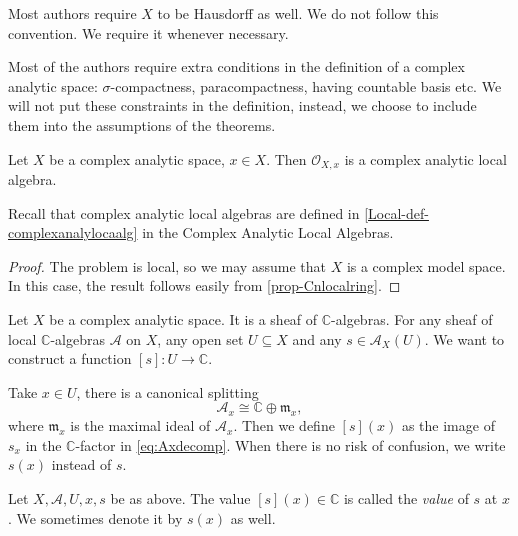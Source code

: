 \begin{remark}
    Most authors require $X$ to be Hausdorff as well. We do not follow this convention. We require it whenever necessary.
\end{remark}
\begin{remark}
    Most of the authors require extra conditions in the definition of a complex analytic space: $\sigma$-compactness, paracompactness, having countable basis etc. We will not put these constraints in the definition, instead, we choose to include them into the assumptions of the theorems.
\end{remark}

\begin{proposition}
    Let $X$ be a complex analytic space, $x\in X$. Then $\mathcal{O}_{X,x}$ is a complex analytic local algebra.
\end{proposition}
Recall that complex analytic local algebras are defined in \cref{Local-def-complexanalylocaalg} in the Complex Analytic Local Algebras.

\begin{proof}
    The problem is local, so we may assume that $X$ is a complex model space. In this case, the result follows easily from \cref{prop-Cnlocalring}.
\end{proof}

Let $X$ be a complex analytic space. It is a sheaf of $\mathbb{C}$-algebras.
For any sheaf of local $\mathbb{C}$-algebras $\mathcal{A}$ on $X$, any open set $U\subseteq X$ and any $s\in \mathcal{A}_X(U)$. We want to construct a function $[s]:U\rightarrow \mathbb{C}$. 

Take $x\in U$, there is a canonical splitting
\begin{equation}\label{eq:Axdecomp}
  \mathcal{A}_{x}\cong \mathbb{C}\oplus \mathfrak{m}_{x}, 
\end{equation}
where $\mathfrak{m}_x$ is the maximal ideal of $\mathcal{A}_{x}$. Then we define $[s](x)$ as the image of $s_x$ in the $\mathbb{C}$-factor in \eqref{eq:Axdecomp}. When there is no risk of confusion, we write $s(x)$ instead of $s$.

\begin{definition}\label{def-valuesectionatapoint}
    Let $X,\mathcal{A},U,x,s$ be as above. The value $[s](x)\in \mathbb{C}$ is called the \emph{value} of $s$ at $x$. We sometimes denote it by $s(x)$ as well.
\end{definition}


